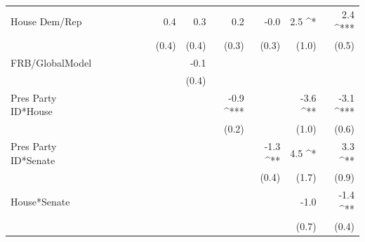 \documentclass[a4paper]{article}\usepackage{graphicx, color}
\begin{document}
\begin{table}[ht]
\begin{center}
{\begin{tabular}{ l D{.}{.}{1}D{.}{.}{1}D{.}{.}{1}D{.}{.}{1}D{.}{.}{1}D{.}{.}{1}D{.}{.}{1}D{.}{.}{1}D{.}{.}{1}D{.}{.}{1}D{.}{.}{1} }
House Dem/Rep        &                 &                 &                 &                 &                 & 0.4             & 0.3             & 0.2             & -0.0            & 2.5 ^*          & 2.4 ^{***}     \\ 
                     &                 &                 &                 &                 &                 & (0.4)           & (0.4)           & (0.3)           & (0.3)           & (1.0)           & (0.5)          \\ 
FRB/GlobalModel      &                 &                 &                 &                 &                 &                 & -0.1            &                 &                 &                 &                \\ 
                     &                 &                 &                 &                 &                 &                 & (0.4)           &                 &                 &                 &                \\ 
Pres Party ID*House  &                 &                 &                 &                 &                 &                 &                 & -0.9 ^{***}     &                 & -3.6 ^{**}      & -3.1 ^{***}    \\ 
                     &                 &                 &                 &                 &                 &                 &                 & (0.2)           &                 & (1.0)           & (0.6)          \\ 
Pres Party ID*Senate &                 &                 &                 &                 &                 &                 &                 &                 & -1.3 ^{**}      & 4.5 ^*          & 3.3 ^{**}      \\ 
                     &                 &                 &                 &                 &                 &                 &                 &                 & (0.4)           & (1.7)           & (0.9)          \\ 
House*Senate         &                 &                 &                 &                 &                 &                 &                 &                 &                 & -1.0            & -1.4 ^{**}     \\ 
                     &                 &                 &                 &                 &                 &                 &                 &                 &                 & (0.7)           & (0.4)           \\

\end{tabular}}
\end{center}
\end{table}
\end{document}
